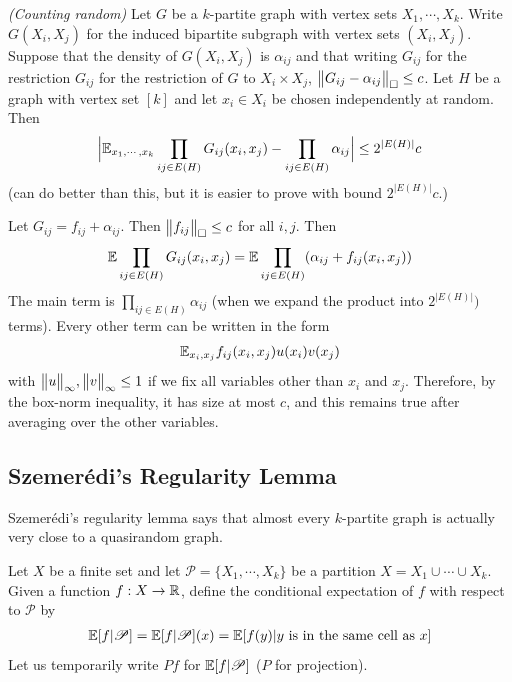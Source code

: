 \documentclass[10pt,a4paper]{report}
\newenvironment{proof}
{\begin{changemargin}{1cm}{0.5cm}
	}%
	{\end{changemargin}
}
\begin{document}
 \emph{(Counting random)} Let $G$ be a $k$-partite graph with vertex sets $X_1, \cdots, X_k$. Write $G(X_i, X_j)$ for the induced bipartite subgraph with vertex sets $(X_i, X_j)$. Suppose that the density of $G(X_i, X_j)$ is $\alpha_{ij}$ and that writing $G_{ij}$ for the restriction $G_{ij}$ for the restriction of $G$ to $X_i \times X_j$, $\bigl\lVert G_{ij} - \alpha_{ij}\bigr\rVert_{\tiny{\square}} \leq c$. Let $H$ be a graph with vertex set $[k]$ and let $x_i \in X_i$ be chosen independently at random. Then
\begin{align*}
\Big| \mathbb{E}_{x_1, \cdots, x_k} \prod_{ij \in E(H)} G_{ij} (x_i, x_j) - \prod_{ij\in E(H)} \alpha_{ij} \Big| \leq 2^{|E(H)|} c
\end{align*}
(can do better than this, but it is easier to prove with bound $2^{|E(H)|} c$.)
\begin{proof}
\pf Let $G_{ij} = f_{ij} + \alpha_{ij}$. Then $\bigl\lVert f_{ij}\bigr\rVert_{\tiny{\square}} \leq c$ for all $i,j$. Then
\begin{align*}
\mathbb{E} \prod_{ij \in E(H)} G_{ij}(x_i,x_j) = \mathbb{E} \prod_{ij\in E(H)} (\alpha_{ij} + f_{ij}(x_i, x_j))
\end{align*}
The main term is $\prod_{ij\in E(H)} \alpha_{ij}$ (when we expand the product into $2^{|E(H)|})$ terms). Every other term can be written in the form
\begin{align*}
\mathbb{E}_{x_i, x_j} f_{ij}(x_i,x_j) u(x_i) v(x_j)
\end{align*}
with $\bigl\lVert u\bigr\rVert_{\infty},\bigl\lVert v\bigr\rVert_{\infty} \leq 1$ if we fix all variables other than $x_i$ and $x_j$. Therefore, by the box-norm inequality, it has size at most $c$, and this remains true after averaging over the other variables. 

\eop
\end{proof}
\s

\subsection*{Szemer\'{e}di's Regularity Lemma}

Szemer\'{e}di's regularity lemma says that almost every $k$-partite graph is actually very close to a quasirandom graph.
\s

Let $X$ be a finite set and let $\mathscr{P}= \{ X_1, \cdots, X_k \}$ be a partition $X=X_1 \cup \cdots \cup X_k$. Given a function $f: X\rightarrow \mathbb{R}$, define the conditional expectation of $f$ with respect to $\mathscr{P}$ by
\begin{align*}
\mathbb{E} [f | \mathscr{P}] = \mathbb{E}[f|\mathscr{P}](x) = \mathbb{E}[f(y) | y \text{ is in the same cell as } x]
\end{align*}
Let us temporarily write $Pf$ for $\mathbb{E}[f|\mathscr{P}]$ ($P$ for projection).
\s
\end{document}
